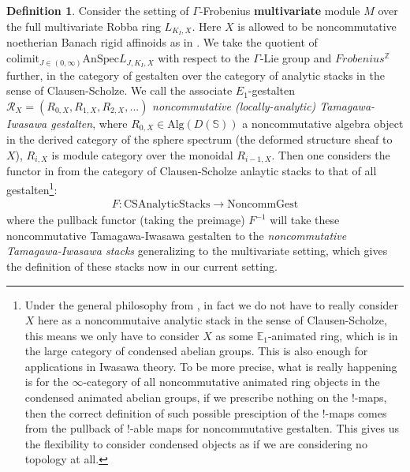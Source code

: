 \documentclass[12pt]{article}
\theoremstyle{definition}
\newtheorem{definition}{Definition}
\begin{document}
\begin{definition}
Consider the setting of $\Gamma$-Frobenius \textbf{multivariate} module $M$ over the full multivariate Robba ring $L_{K_I,X}$. Here $X$ is allowed to be noncommutative noetherian Banach rigid affinoids as in \cite{T}. We take the quotient of $\mathrm{colimit}_{J\in (0,\infty)}\mathrm{AnSpec}L_{J,K_I,X}$ with respect to the $\Gamma$-Lie group and $Frobenius^\mathbb{Z}$ further, in the category of gestalten over the category of analytic stacks in the sense of Clausen-Scholze. We call the associate $E_1$-gestalten $\mathcal{R}_X = (R_{0,X}, R_{1,X}, R_{2,X},...)$ \textit{noncommutative (locally-analytic) Tamagawa-Iwasawa gestalten}, where $R_{0,X}\in \mathrm{Alg}(D(\mathbb{S}))$ a noncommutative algebra object in the derived category of the sphere spectrum (the deformed structure sheaf to $X$), $R_{i,X}$ is module category over the monoidal $R_{i-1,X}$. Then one considers the functor in \cite{5S5} from the category of Clausen-Scholze anlaytic stacks to that of all gestalten\footnote{Under the general philosophy from \cite{5S5}, in fact we do not have to really consider $X$ here as a noncommutaive analytic stack in the sense of Clausen-Scholze, this means we only have to consider $X$ as some $\mathbb{E}_1$-animated ring, which is in the large category of condensed abelian groups. This is also enough for applications in Iwasawa theory. To be more precise, what is really happening is for the $\infty$-category of all noncommutative animated ring objects in the condensed animated abelian groups, if we prescribe nothing on the $!$-maps, then the correct definition of such possible presciption of the $!$-maps comes from the pullback of $!$-able maps for noncommutative gestalten. This gives us the flexibility to consider condensed objects as if we are considering no topology at all.}:
\begin{align}
F: \mathrm{CSAnalyticStacks}\rightarrow \mathrm{NoncommGest}
\end{align}
where the pullback functor (taking the preimage) $F^{-1}$ will take these noncommutative Tamagawa-Iwasawa gestalten to the \textit{noncommutative Tamagawa-Iwasawa stacks} generalizing \cite{5M} to the multivariate setting, which gives the definition of these stacks now in our current setting.
\end{definition}
\end{document}
